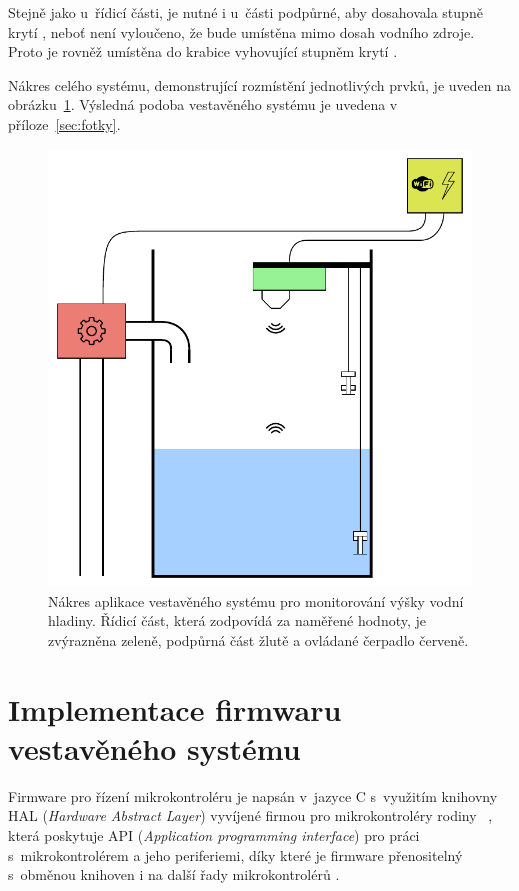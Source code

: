         Stejně jako u~řídicí části, je nutné i u~části podpůrné, aby dosahovala stupně krytí , neboť není vyloučeno, že bude umístěna mimo dosah vodního zdroje. Proto je rovněž umístěna do krabice  vyhovující stupněm krytí .

        Nákres celého systému, demonstrující rozmístění jednotlivých prvků, je uveden na obrázku~\ref{img:system_scheme}. Výsledná podoba vestavěného systému je uvedena v příloze~\ref{sec:fotky}.

        \begin{figure}[h]
            \centering
            \includegraphics[width=0.8\linewidth]{obrazky-figures/system.pdf}
            \caption{Nákres aplikace vestavěného systému pro monitorování výšky vodní hladiny. Řídicí část, která zodpovídá za naměřené hodnoty, je zvýrazněna zeleně, podpůrná část žlutě a ovládané čerpadlo červeně.}
            \label{img:system_scheme}
        \end{figure}

\chapter{Implementace firmwaru vestavěného systému}
    Firmware pro řízení mikrokontroléru  je napsán v~jazyce C s~využitím knihovny HAL (\textit{Hardware Abstract Layer}) vyvíjené firmou  pro mikrokontroléry rodiny ~\cite{stm:hal}, která poskytuje API (\textit{Application programming interface}) pro práci s~mikrokontrolérem a jeho periferiemi, díky které je firmware přenositelný s~obměnou knihoven i na další řady mikrokontrolérů .
    
